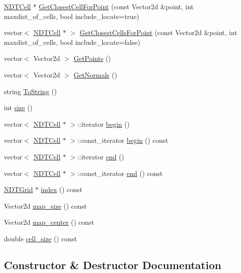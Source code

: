 \begin{DoxyCompactItemize}
\hyperlink{classNDTCell}{N\+D\+T\+Cell} $\ast$ \hyperlink{classNDTMap_a304a9fa19f39944b49d0ab3d84bf5aae}{Get\+Closest\+Cell\+For\+Point} (const Vector2d \&point, int maxdist\+\_\+of\+\_\+cells, bool include\+\_\+locate=true)
\item 
vector$<$ \hyperlink{classNDTCell}{N\+D\+T\+Cell} $\ast$ $>$ \hyperlink{classNDTMap_a0a4879ae61a1e3e8d634cbca02bfd9ce}{Get\+Closest\+Cells\+For\+Point} (const Vector2d \&point, int maxdist\+\_\+of\+\_\+cells, bool include\+\_\+locate=false)
\item 
vector$<$ Vector2d $>$ \hyperlink{classNDTMap_afbeaa3c223cb78b970601c31eebb8b8d}{Get\+Points} ()
\item 
vector$<$ Vector2d $>$ \hyperlink{classNDTMap_a81de728bee39e48fefcb92a893f53611}{Get\+Normals} ()
\item 
string \hyperlink{classNDTMap_ab08b05e7708a1c28d6c9c0f27287a1c8}{To\+String} ()
\item 
int \hyperlink{classNDTMap_a72afff09b746b402d277945231af5d60}{size} ()
\item 
vector$<$ \hyperlink{classNDTCell}{N\+D\+T\+Cell} $\ast$ $>$\+::iterator \hyperlink{classNDTMap_adf9226d12395621fad8f75d94e9f8cc7}{begin} ()
\item 
vector$<$ \hyperlink{classNDTCell}{N\+D\+T\+Cell} $\ast$ $>$\+::const\+\_\+iterator \hyperlink{classNDTMap_a696381901e5f856af6c4ecec37770e1f}{begin} () const
\item 
vector$<$ \hyperlink{classNDTCell}{N\+D\+T\+Cell} $\ast$ $>$\+::iterator \hyperlink{classNDTMap_a001f919cb4e5b0a784b9b69ba95cb035}{end} ()
\item 
vector$<$ \hyperlink{classNDTCell}{N\+D\+T\+Cell} $\ast$ $>$\+::const\+\_\+iterator \hyperlink{classNDTMap_a96f1e8b110d1a542f06792945e240cb3}{end} () const
\item 
\hyperlink{classNDTGrid}{N\+D\+T\+Grid} $\ast$ \hyperlink{classNDTMap_ad319bbb8860c6f2214a30bb7d64525e5}{index} () const
\item 
Vector2d \hyperlink{classNDTMap_aa737ee61fd3b732c7d0fe3cdae4b42d2}{map\+\_\+size} () const
\item 
Vector2d \hyperlink{classNDTMap_a5bc1d0a7b7949886670afb4f3c271a37}{map\+\_\+center} () const
\item 
double \hyperlink{classNDTMap_a3395ccebb28846b416550ba71b5da174}{cell\+\_\+size} () const
\end{DoxyCompactItemize}


\subsection{Constructor \& Destructor Documentation}
\mbox{\label{classNDTMap_aec578016c17abfe085d0d4cf1dca1828}} 
